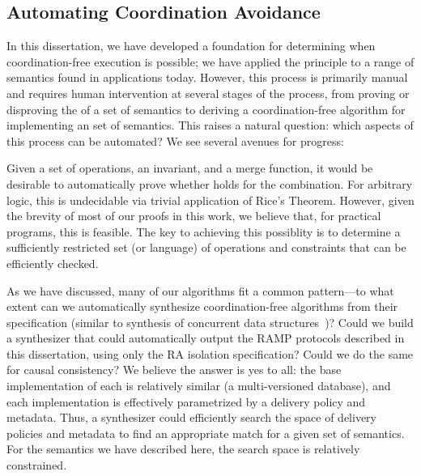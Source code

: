 \subsection{Automating Coordination Avoidance}

In this dissertation, we have developed a foundation for determining
when coordination-free execution is possible; we have applied the
\iconfluence principle to a range of semantics found in applications
today. However, this process is primarily manual and requires human
intervention at several stages of the process, from proving or
disproving the \iconfluence of a set of semantics to deriving a
coordination-free algorithm for implementing an \iconfluent set of
semantics. This raises a natural question: which aspects of this
process can be automated? We see several avenues for progress:

 Given a set of
operations, an invariant, and a merge function, it would be desirable
to automatically prove whether \iconfluence holds for the
combination. For arbitrary logic, this is undecidable via trivial
application of Rice's Theorem. However, given
the brevity of most of our proofs in this work, we believe that, for
practical programs, this is feasible. The key to achieving this
possiblity is to determine a sufficiently restricted set (or language)
of operations and constraints that can be efficiently checked.

 As we have
discussed, many of our algorithms fit a common pattern---to what
extent can we automatically synthesize coordination-free algorithms
from their specification (similar to synthesis of concurrent data
structures~\cite{aiken-synthesis})? Could we build a synthesizer that
could automatically output the RAMP protocols described in this
dissertation, using only the RA isolation specification? Could we do
the same for causal consistency? We believe the answer is yes to all:
the base implementation of each is relatively similar (a
multi-versioned database), and each implementation is effectively
parametrized by a delivery policy and metadata. Thus, a synthesizer
could efficiently search the space of delivery policies and metadata
to find an appropriate match for a given set of semantics. For the
semantics we have described here, the search space is relatively
constrained.

